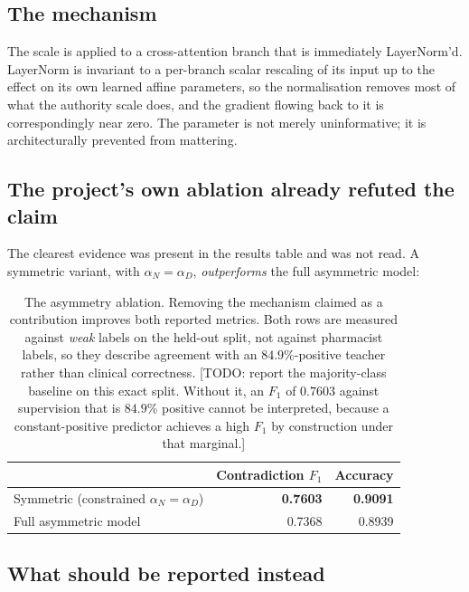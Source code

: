 \subsection{The mechanism}

The scale is applied to a cross-attention branch that is immediately
LayerNorm'd. LayerNorm is invariant to a per-branch scalar rescaling of its
input up to the effect on its own learned affine parameters, so the normalisation
removes most of what the authority scale does, and the gradient flowing back to
it is correspondingly near zero. The parameter is not merely uninformative; it
is architecturally prevented from mattering.

\subsection{The project's own ablation already refuted the claim}

The clearest evidence was present in the results table and was not read. A
symmetric variant, with $\alpha_N = \alpha_D$, \emph{outperforms} the full
asymmetric model:

\begin{table}[h]
\centering
\small
\begin{tabular}{lrr}
\toprule
 & \textbf{Contradiction $F_1$} & \textbf{Accuracy} \\
\midrule
Symmetric (constrained $\alpha_N = \alpha_D$) & \textbf{0.7603} & \textbf{0.9091} \\
Full asymmetric model                          & 0.7368 & 0.8939 \\
\bottomrule
\end{tabular}
\caption{The asymmetry ablation. Removing the mechanism claimed as a
contribution improves both reported metrics. Both rows are measured against
\emph{weak} labels on the held-out split, not against pharmacist labels, so they
describe agreement with an $84.9\%$-positive teacher rather than clinical
correctness. [TODO: report the majority-class baseline on this exact split.
Without it, an $F_1$ of $0.7603$ against supervision that is $84.9\%$ positive
cannot be interpreted, because a constant-positive predictor achieves a high
$F_1$ by construction under that marginal.]}
\label{tab:acne}
\end{table}

\subsection{What should be reported instead}


